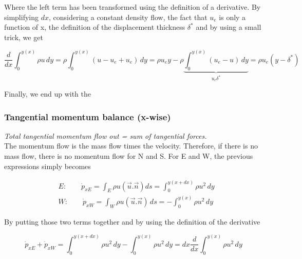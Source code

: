 Where the left term has been transformed using the definition of a derivative.
By simplifying $dx$, considering a constant density flow, the fact that $u_{e}$ is only a function of x, the definition of the displacement thickness $\delta^*$ and by using a small trick, we get

\begin{equation}
\frac{d}{dx} \int_{0}^{y(x)} \rho u \, dy = \rho \int_{0}^{y(x)}  (u-u_e+u_e) \, dy = \rho u_e y  -\rho \underbrace{\int_{0}^{y(x)}  (u_e-u) \, dy}_{u_e\delta ^*} = \rho u_e(y-\delta^*)
\end{equation}

Finally, we end up with the

\begin{center}
\end{center}

\subsubsection{Tangential momentum balance (x-wise)}

\textit{Total tangential momentum flow out = sum of tangential forces.}
\\

The momentum flow is the mass flow times the velocity. Therefore, if there is no mass flow, there is no momentum flow for N and S. For E and W, the previous expressions simply becomes

\begin{equation}
\begin{aligned}
&E: \qquad
		\dot{p}_{xE}= \int_{E} \rho u (\vec{u}.\vec{n}) d s  
		= \int_{0}^{y(x+dx)} \rho u^2 \, dy  \\
&W: \qquad
		\dot{p}_{xW}= \int_{W} \rho u (\vec{u}.\vec{n})\, d s  
		= - \int_{0}^{y(x)} \rho u^2 \, dy  
		\end{aligned}
\end{equation}

By putting those two terms together and by using the definition of the derivative

\begin{equation}
\dot{p}_{xE}+\dot{p}_{xW} = \int_{0}^{y(x+dx)} \rho u^2 \, dy - \int_{0}^{y(x)} \rho u^2 \, dy  =dx \frac{d}{dx} \int_{0}^{y(x)} \rho u^2 \, dy
\end{equation}

